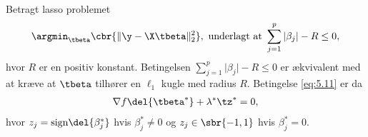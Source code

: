 \begin{exmp}
Betragt lasso problemet
\begin{align*}
\argmin_{\tbeta} \cbr{ \Vert \y - \X \tbeta \Vert_2^2}, \ \text{underlagt at } \sum_{j=1}^p \vert \beta_j \vert - R \leq 0,
\end{align*}
hvor \(R\) er en positiv konstant.
Betingelsen \( \sum_{j=1}^p \vert \beta_j \vert - R \leq 0\) er ækvivalent med at kræve at \(\tbeta\) tilhører en \(\ell_1\) kugle med radius \(R\).
Betingelse \eqref{eq:5.11} er da
\begin{align*}
\nabla f \del{\tbeta^*} + \lambda^* \tz^* = 0,
\end{align*}
hvor 
\(z_j =\text{sign} \del{\beta_j^*}\) hvis \(\beta_j^* \neq 0\) og \(z_j \in \sbr{-1,1}\) hvis \(\beta_j^* = 0\).
\end{exmp}




